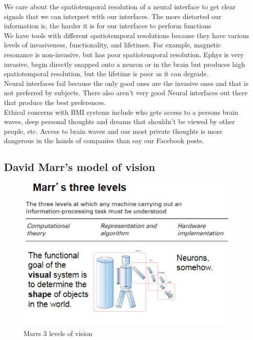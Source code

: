 \documentclass{article}
\begin{document}
We care about the spatiotemporal resolution of a neural interface to get clear signals that we can interpret with our interfaces. The more distorted our information is, the harder it is for our interfaces to perform functions \\

We have tools with different spatiotemporal resolutions because they have various levels of invasiveness, functionality, and lifetimes. For example, magnetic resonance is non-invasive, but has poor spatiotemporal resolution. Ephys is very invasive, begin directly snapped onto a neuron or in the brain but produces high spatiotemporal resolution, but the lifetime is poor as it can degrade. \\

Neural interfaces fail because the only good ones are the invasive ones and that is not preferred by subjects. There also aren't very good Neural interfaces out there that produce the best preferences. \\

Ethical concerns with BMI systems include who gets access to a persons brain waves, deep personal thoughts and dreams that shouldn't be viewed by other people, etc. Access to brain waves and our most private thoughts is more dangerous in the hands of companies than say our Facebook posts. 

\subsection{David Marr's model of vision}

\begin{figure}[htp]
\centering
\includegraphics[width=\textwidth]{images/marrsvision.PNG}
\caption{Marrs 3 levels of vision}
\label{fig:neuron}
\end{figure}
\end{document}
